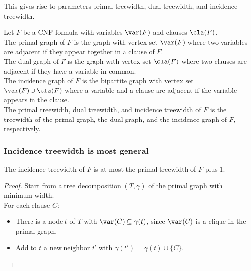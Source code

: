 \begin{frame}[label=graphs]
\hspace*{5mm}%

\noindent
This gives rise to parameters \alert{primal treewidth}, \alert{dual treewidth,} and
\alert{incidence treewidth.}

\end{frame}

\begin{frame}
	
	\begin{definition}
		Let $F$ be a CNF formula with variables $\var(F)$ and clauses $\cla(F)$.\\
		The \alert{primal graph} of $F$ is the graph with vertex set $\var(F)$ where two variables are adjacent if they appear together in a clause of $F$.\\
		The \alert{dual graph} of $F$ is the graph with vertex set $\cla(F)$ where two clauses are adjacent if they have a variable in common.\\
		The \alert{incidence graph} of $F$ is the bipartite graph with vertex set $\var(F) \cup \cla(F)$ where a variable and a clause are adjacent if the variable appears in the clause.\\
		The \alert{primal treewidth}, \alert{dual treewidth}, and \alert{incidence treewidth} of $F$ is the treewidth of the primal graph, the dual graph, and the incidence graph of $F$, respectively.
	\end{definition}
\end{frame}
 
\begin{frame}
  \frametitle{Incidence treewidth is most general}
  \begin{lemma}
   The incidence treewidth of $F$ is at most the primal treewidth of $F$ plus $1$.
  \end{lemma}
  \begin{proof}
    Start from a tree decomposition $(T,\gamma)$ of the primal graph with minimum width.\\
	For each clause $C$:
	\begin{itemize}
		 \item There is a node $t$ of $T$ with
		 $\var(C)\subseteq \gamma(t)$, since $\var(C)$ is a clique in the primal graph.
		 \item Add to $t$ a new neighbor $t'$ with $\gamma(t')=\gamma(t)\cup
		 \{C\}$.
    \end{itemize}
  \end{proof}
\end{frame}

